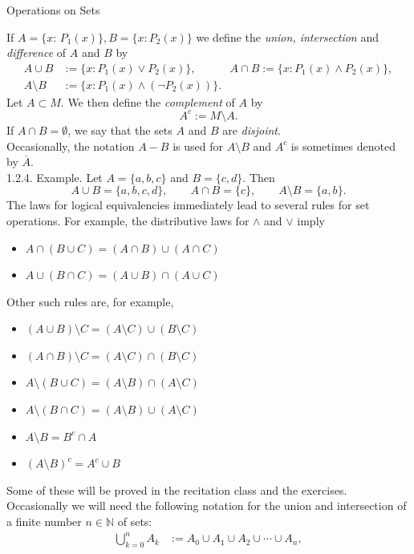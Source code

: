 \documentclass[smaller,hyperref={CJKbookmarks=true}]{beamer}
\newcommand{\N}{\mathbb{N}} \newcommand{\Z}{\mathbb{Z}} \newcommand{\Q}{\mathbb{Q}}
\begin{document}
\begin{frame}{Operations on Sets}
\begin{spacing}{1.00}
\vspace*{-6pt}
If $A=\{x\!:\,P_1(x)\},B=\{x\!:P_2(x)\}$ we define the \emph{union, intersection} and \emph{dif{}ference} of $A$ and $B$ by
\begin{align*}
  A\cup B &:=\{x\!:P_1(x)\vee P_2(x)\},\qquad\quad A\cap B:=\{x\!:P_1(x)\wedge P_2(x)\}, \\
  A\setminus B &:=\{x\!:P_1(x)\wedge(\neg P_2(x))\}.
\end{align*}
Let $A\subset M$. We then define the \emph{complement} of $A$ by
\[A^c:=M\setminus A.\]
If $A\cap B=\emptyset$, we say that the sets $A$ and $B$ are \emph{disjoint}.\\[4pt]
Occasionally, the notation $A-B$ is used for $A\setminus B$ and $A^c$ is sometimes denoted by $\overline{A}$.\\[3pt]
\alert{1.2.4. Example.} Let $A=\{a,b,c\}$ and $B=\{c,d\}$. Then
\[A\cup B=\{a,b,c,d\},\qquad A\cap B=\{c\},\qquad A\setminus B=\{a,b\}.\]
\newpage
The laws for logical equivalencies immediately lead to several rules for set
operations. For example, the distributive laws for $\wedge$ and $\vee$ imply
\begin{itemize}
  \item $A\cap(B\cup C)=(A\cap B)\cup(A\cap C)$
  \item $A\cup(B\cap C)=(A\cup B)\cap(A\cup C)$
\end{itemize}
Other such rules are, for example,
\begin{itemize}
  \item $(A\cup B)\setminus C=(A\setminus C)\cup(B\setminus C)$
  \item $(A\cap B)\setminus C=(A\setminus C)\cap(B\setminus C)$
  \item $A\setminus(B\cup C)=(A\setminus B)\cap(A\setminus C)$
  \item $A\setminus(B\cap C)=(A\setminus B)\cup(A\setminus C)$
  \item $A\setminus B=B^c\cap A$
  \item $(A\setminus B)^c=A^c\cup B$
\end{itemize}
Some of these will be proved in the recitation class and the exercises.
\newpage
Occasionally we will need the following notation for the union and
intersection of a finite number $n\in\N$ of sets:
\begin{align*}
  \bigcup_{k=0}^n A_k &:=A_0\cup A_1\cup A_2\cup\cdots\cup A_n, \\

\end{align*}
\end{spacing}
\end{frame}
\end{document}
